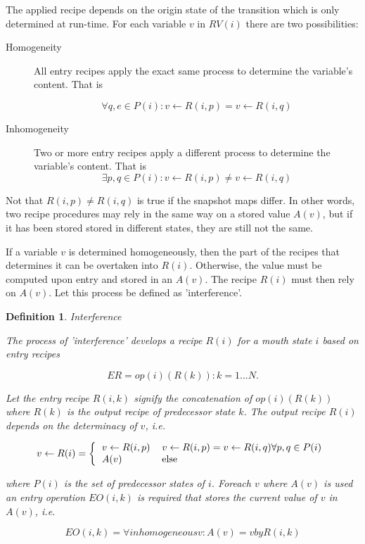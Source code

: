 \documentclass[12pt,a4paper]{scrartcl}
\theoremstyle{break}
\newtheorem{definition}{Definition}
\begin{document}
The applied recipe depends on the origin state of the transition which is only
determined at run-time.  For each variable $v$ in $RV(i)$ there are two
possibilities:

\begin{description}
    \item[Homogeneity] All entry recipes apply the exact same process to
                       determine the variable's content. That is

    \[
        \forall q,e \in P(i): v \leftarrow R(i,p) = v \leftarrow R(i,q) 
    \]

    \item[Inhomogeneity] Two or more entry recipes apply a different process
                         to determine the variable's content. That is
    \[
        \exists p,q \in P(i): v \leftarrow R(i,p) \neq v \leftarrow R(i,q)
    \]
\end{description}

Not that \(R(i,p) \neq R(i,q)\) is true if the snapshot maps differ. In other
words, two recipe procedures may rely in the same way on a stored value $A(v)$,
but if it has been stored stored in different states, they are still not
the same.

If a variable $v$ is determined homogeneously, then the part of the recipes
that determines it can be overtaken into $R(i)$. Otherwise, the value must be
computed upon entry and stored in an $A(v)$. The recipe $R(i)$ must then rely
on $A(v)$. Let this process be defined as 'interference'.

\begin{definition}
Interference

The process of 'interference' develops a recipe $R(i)$ for a mouth state
$i$ based on entry recipes 

\[
              ER = { op(i)(R(k)): k = 1...N }. 
\]
              
Let the entry recipe $R(i,k)$ signify the concatenation of $op(i)(R(k))$
where $R(k)$ is the output recipe of predecessor state $k$. The output
recipe $R(i)$ depends on the determinacy of $v$, i.e. 
          
\begin{equation}
    v \leftarrow R(i) = \left \{
         \begin{tabular}{ll}
            $v \leftarrow R(i,p)$ & $v \leftarrow R(i,p) = v \leftarrow R(i,q) \forall p,q \in P(i)$ \\
            $A(v)$                & else
         \end{tabular}
         \right .
\end{equation}

where $P(i)$ is the set of predecessor states of $i$. Foreach $v$ where
$A(v)$ is used an entry operation $EO(i,k)$ is required that stores
the current value of $v$ in $A(v)$, i.e.

\[
     EO(i,k) = { \forall inhomogeneous v: A(v) = v by R(i,k) }
\]

\end{definition}
\end{document}
